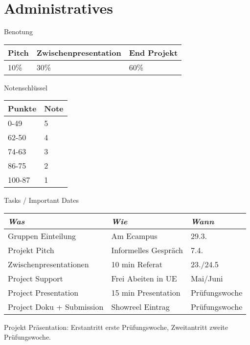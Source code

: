 
\section{Administratives}
 \frame{\sectionpage}

\begin{frame}{Benotung}

 
\begin{table}[]
\begin{tabular}{l|l|l}
Pitch & Zwischenpresentation & End Projekt \\ \hline
10\%  & 30\%                & 60\%       
\end{tabular}
\end{table}



\end{frame}


\begin{frame}{Notenschlüssel}


 
\begin{table}[]
\begin{tabular}{l|l}
Punkte & Note \\ \hline
0-49   & 5    \\
62-50  & 4    \\
74-63  & 3    \\
86-75  & 2    \\
100-87 & 1   
\end{tabular}
\end{table}

\end{frame}


\begin{frame}{Tasks / Important Dates}
\begin{table}[]
\begin{tabular}{l|l|l}
\emph{Was}   &  \emph{Wie}             &	\emph{Wann}	\\ \hline
Gruppen Einteilung   & Am Ecampus              &		29.3. \\  
Projekt Pitch        & Informelles Gespräch              &	7.4.	\\
Zwischenpresentationen        & 10 min Referat              &	23./24.5	\\
Project Support      & Frei Abeiten in UE              &	Mai/Juni	\\
Project Presentation & 15 min Presentation & Prüfungswoche \\
Project Doku + Submission & Showreel Eintrag & Prüfungswoche
\end{tabular}
\end{table}

Projekt Präsentation: Erstantritt erste Prüfungswoche, Zweitantritt zweite Prüfungswoche.

\end{frame}



